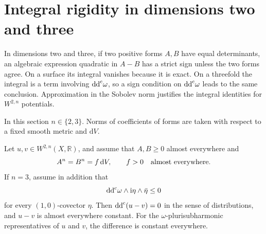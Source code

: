 \section{Integral rigidity in dimensions two and three}
\label{uni-sec:lowdim}

In dimensions two and three, if two positive forms $A,B$ have equal determinants, an algebraic expression quadratic in $A-B$ has a strict sign unless the two forms agree. On a surface its integral vanishes because it is exact. On a threefold the integral is a term involving $\mathrm{dd}^{\mathrm{c}}\omega$, so a sign condition on $\mathrm{dd}^{\mathrm{c}}\omega$ leads to the same conclusion. Approximation in the Sobolev norm justifies the integral identities for $W^{2,n}$ potentials.

In this section $n\in\{2,3\}$. Norms of coefficients of forms are taken with respect to a fixed smooth metric and $\mathrm{d}V$.

\begin{theorem}\label{uni-thm:sobolev}
Let $u,v\in W^{2,n}(X,\mathbb R)$, and assume that
$A,B\geq0$ almost everywhere and
\[
  A^n=B^n=f\,\mathrm{d}V,\qquad f>0\quad\hbox{almost everywhere}.
\]
If $n=3$, assume in addition that
\begin{equation}
  \mathrm{dd}^{\mathrm{c}}\omega\wedge\mathrm{i}\eta\wedge\bar\eta\leq0
  \label{uni-eq:threefold-sign}
\end{equation}
for every $(1,0)$-covector $\eta$.  Then
$\mathrm{dd}^{\mathrm{c}}(u-v)=0$ in the sense of distributions, and $u-v$ is almost everywhere constant.
For the $\omega$-plurisubharmonic representatives of $u$ and $v$, the difference is constant everywhere.
\end{theorem}

